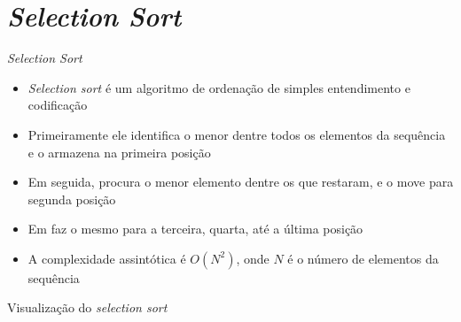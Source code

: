 \section{\it Selection Sort}

\begin{frame}[fragile]{\it Selection Sort}

    \begin{itemize}
        \item \textit{Selection sort} é um algoritmo de ordenação de simples entendimento e
            codificação

        \item Primeiramente ele identifica o menor dentre todos os elementos da sequência e 
            o armazena na primeira posição

        \item Em seguida, procura o menor elemento dentre os que restaram, e o move para 
            segunda posição

        \item Em faz o mesmo para a terceira, quarta, até a última posição

        \item A complexidade assintótica é $O(N^2)$, onde $N$ é o número de elementos da 
            sequência
    \end{itemize}

\end{frame}

\begin{frame}[fragile]{Visualização do {\it selection sort}}


\end{frame}

